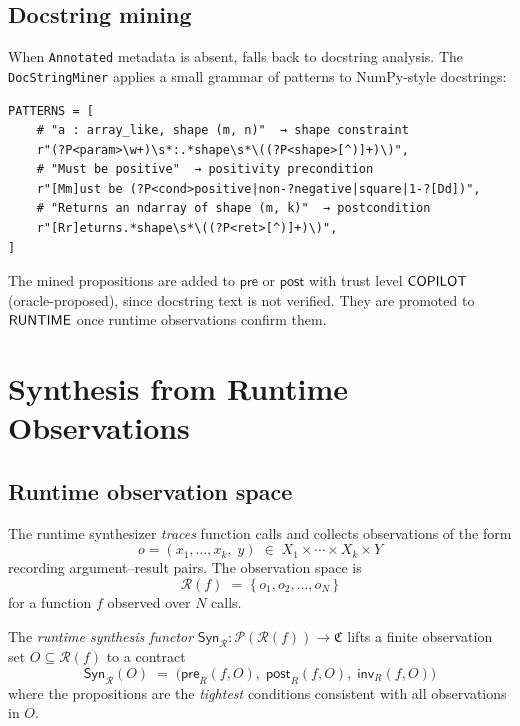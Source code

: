 \documentclass[11pt]{article}
\newcommand{\Syn}{\mathsf{Syn}}            %
\newcommand{\Pre}{\mathsf{pre}}            %
\newcommand{\Post}{\mathsf{post}}          %
\newcommand{\Inv}{\mathsf{inv}}            %
\newcommand{\RunObs}{\mathcal{R}}          %
\newcommand{\ContractSpace}{\mathfrak{C}}  %
\newcommand{\SynR}{\Syn_{\RunObs}}         %
\begin{document}
\subsection{Docstring mining}

When \texttt{Annotated} metadata is absent, \JuGeo{} falls back to
docstring analysis.  The \texttt{DocStringMiner} applies a small
grammar of patterns to NumPy-style docstrings:

\begin{lstlisting}[style=jugeo-python,
  caption={Docstring pattern grammar (simplified).}]
PATTERNS = [
    # "a : array_like, shape (m, n)"  → shape constraint
    r"(?P<param>\w+)\s*:.*shape\s*\((?P<shape>[^)]+)\)",
    # "Must be positive"  → positivity precondition
    r"[Mm]ust be (?P<cond>positive|non-?negative|square|1-?[Dd])",
    # "Returns an ndarray of shape (m, k)"  → postcondition
    r"[Rr]eturns.*shape\s*\((?P<ret>[^)]+)\)",
]
\end{lstlisting}

The mined propositions are added to $\Pre$ or $\Post$ with trust level
$\mathsf{COPILOT}$ (oracle-proposed), since docstring text is not verified.
They are promoted to $\mathsf{RUNTIME}$ once runtime observations confirm
them.

\section{Synthesis from Runtime Observations}\label{sec:runtime-synthesis}

\subsection{Runtime observation space}

The runtime synthesizer \emph{traces} function calls and collects
observations of the form
\[
  o = (x_1, \ldots, x_k,\; y)
  \;\in\; X_1 \times \cdots \times X_k \times Y
\]
recording argument–result pairs.  The observation space is
\[
  \RunObs(f) \;=\; \bigl\{\, o_1, o_2, \ldots, o_N \,\bigr\}
\]
for a function $f$ observed over $N$ calls.

\begin{definition}\label{def:synR}
The \emph{runtime synthesis functor}
$\SynR\colon \mathcal{P}(\RunObs(f)) \to \ContractSpace$
lifts a finite observation set $O \subseteq \RunObs(f)$ to a contract
\[
  \SynR(O) \;=\; \bigl(\Pre_R(f, O),\; \Post_R(f, O),\; \Inv_R(f, O)\bigr)
\]
where the propositions are the \emph{tightest} conditions consistent
with all observations in $O$.
\end{definition}
\end{document}
